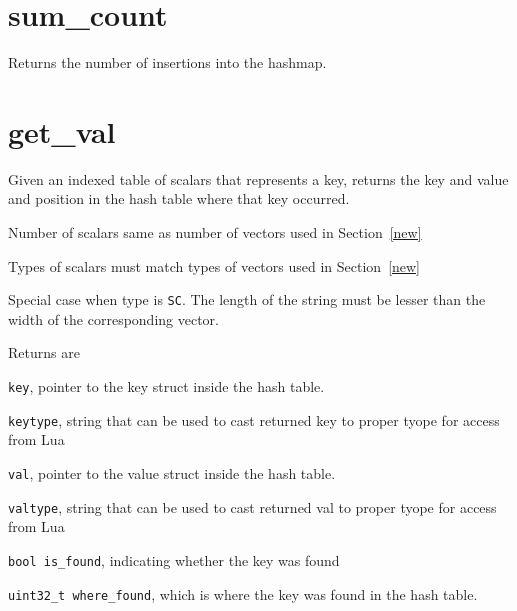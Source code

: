 \section{sum\_count}
\label{sum_count}
Returns the number of insertions into the hashmap.

\section{get\_val}
\label{get_val}

Given an indexed table of scalars that represents a key, 
returns the key and value and position in the hash table where that key
occurred. 

\be
\item Number of scalars same as number of vectors used in Section~\ref{new}
\item Types of scalars must match types of vectors used in Section~\ref{new}
\item Special case when type is {\tt SC}. The length of the string must be
lesser than the width of the corresponding vector.
\ee

Returns are 
\be
\item {\tt key}, pointer to the key struct inside the hash table. 
\item {\tt keytype}, string that can be used to cast returned key to proper tyope
for access from Lua 
\item {\tt val}, pointer to the value struct inside the hash table. 
\item {\tt valtype}, string that can be used to cast returned val to proper tyope
for access from Lua 
\item {\tt bool is\_found}, indicating whether the key was found
\item {\tt uint32\_t where\_found}, which is where the key was  found
in the hash table. 
\ee

